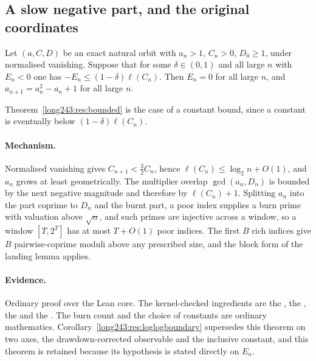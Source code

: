 \subsection{A slow negative part, and the original coordinates}

\begin{theorem}\label{long243:res:slownegative}
Let $(a,C,D)$ be an exact natural orbit with $a_n>1$, $C_n>0$, $D_0\ge1$, under
normalised vanishing.  Suppose that for some $\delta\in(0,1)$ and all large $n$
with $E_n<0$ one has $-E_n\le(1-\delta)\ell(C_n)$.  Then $E_n=0$ for all large
$n$, and $a_{n+1}=a_n^2-a_n+1$ for all large $n$.
\end{theorem}

\noindent Theorem~\ref{long243:res:bounded} is the case of a constant bound, since a
constant is eventually below $(1-\delta)\ell(C_n)$.

\paragraph{Mechanism.}
Normalised vanishing gives $C_{n+1}<\tfrac32C_n$, hence
$\ell(C_n)\le\log_2n+O(1)$, and $a_n$ grows at least geometrically.  The
multiplier overlap $\gcd(a_n,D_n)$ is bounded by the next negative magnitude and
therefore by $\ell(C_n)+1$.  Splitting $a_n$ into the part coprime to $D_n$ and
the burnt part, a poor index supplies a burn prime with valuation above
$\sqrt n$, and such primes are injective across a window, so a window
$[T,2^T]$ has at most $T+O(1)$ poor indices.  The first $B$ rich indices give
$B$ pairwise-coprime moduli above any prescribed size, and the block form of the
landing lemma applies.

\paragraph{Evidence.}
Ordinary proof over the Lean core.  The kernel-checked ingredients are the
, the
, the
 and
the
.  The burn count and the choice of constants are ordinary
mathematics.  Corollary~\ref{long243:res:loglogboundary} supersedes this theorem on two
axes, the drawdown-corrected observable and the inclusive constant, and this
theorem is retained because its hypothesis is stated directly on $E_n$.

